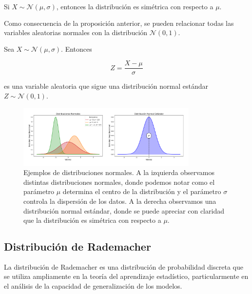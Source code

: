 \begin{proposicion}
    Si $X \sim \mathcal{N}(\mu,\sigma)$, entonces la distribución es simétrica con respecto a $\mu$.\newline
\end{proposicion}

Como consecuencia de la proposición anterior, se pueden relacionar todas las variables aleatorias normales con la distribución $\mathcal{N}(0,1)$.\newline

\begin{proposicion}
    Sea $X \sim \mathcal{N}(\mu,\sigma)$. Entonces
    
    \[ Z = \frac{X-\mu}{\sigma} \]

    es una variable aleatoria que sigue una distribución normal estándar $Z \sim\mathcal{N}(0,1)$.\newline
\end{proposicion}

\begin{figure}[h]
    \centering
    \includegraphics[width=0.8\textwidth]{img/distribuciones-normales.png}
    \caption[Ejemplos de distribuciones normales.] {Ejemplos de distribuciones normales. A la izquierda observamos distintas distribuciones normales, donde podemos notar como el parámetro $\mu$ determina el centro de la distribución y el parámetro $\sigma$ controla la dispersión de los datos. A la derecha observamos una distribución normal estándar, donde se puede apreciar con claridad que la distribución es simétrica con respecto a $\mu$.}\label{fig:distribuciones-normales}
\end{figure}

\subsection{Distribución de Rademacher}\label{subsec:distribucion-rademacher}
La distribución de Rademacher es una distribución de probabilidad discreta que se utiliza ampliamente en la teoría del aprendizaje estadístico, particularmente en el análisis de la capacidad de generalización de los modelos.\newline

